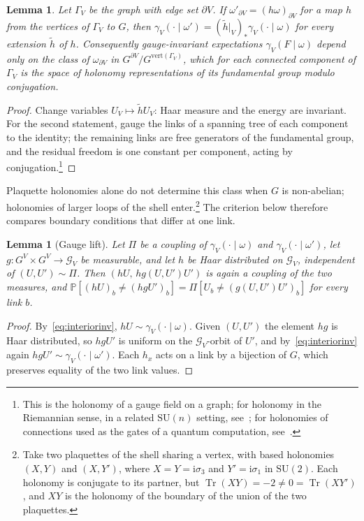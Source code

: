 \documentclass[aps,prd,twocolumn,superscriptaddress,nofootinbib,longbibliography,floatfix,amsmath,amssymb,10pt]{revtex4-2}
\newtheorem{lemma}[theorem]{Lemma}
\theoremstyle{definition}
\theoremstyle{remark}
\newcommand{\SU}{\mathrm{SU}}
\newcommand{\Tr}{\operatorname{Tr}}
\begin{document}
\begin{lemma}\label{lem:quotient}
Let $\Gamma_V$ be the graph with edge set $\partial V$. If
$\omega'_{\partial V}=(h\omega)_{\partial V}$ for a map $h$ from the vertices of
$\Gamma_V$ to $G$, then $\gamma_V(\cdot\mid\omega')=(\tilde h|_V)_*\gamma_V(
\cdot\mid\omega)$ for every extension $\tilde h$ of $h$. Consequently
gauge-invariant expectations $\gamma_V(F\mid\omega)$ depend only on the class of
$\omega_{\partial V}$ in $G^{\partial V}/G^{\mathrm{vert}(\Gamma_V)}$, which for
each connected component of $\Gamma_V$ is the space of holonomy
representations of its fundamental group modulo conjugation.
\end{lemma}

\begin{proof}
Change variables $U_V\mapsto\tilde hU_V$: Haar measure and the energy are
invariant. For the second statement, gauge the links of a spanning tree of
each component to the identity; the remaining links are free generators of
the fundamental group, and the residual freedom is one constant per
component, acting by conjugation.\footnote{This is the holonomy of a gauge
field on a graph; for holonomy in the Riemannian sense, in a related $\SU(n)$
setting, see~\cite{BTBS26}; for holonomies of connections used as the
gates of a quantum computation, see~\cite{Bha26Q}.}
\end{proof}

Plaquette holonomies alone do not determine this class when $G$ is
non-abelian; holonomies of larger loops of the shell enter.\footnote{Take two
plaquettes of the shell sharing a vertex, with based holonomies $(X,Y)$ and
$(X,Y')$, where $X=Y=\mathrm i\sigma_3$ and $Y'=\mathrm i\sigma_1$ in
$\SU(2)$. Each holonomy is conjugate to its partner, but $\Tr(XY)=-2\ne0=
\Tr(XY')$, and $XY$ is the holonomy of the boundary of the union of the two
plaquettes.} The criterion below therefore compares boundary conditions that
differ at one link.

\begin{lemma}[Gauge lift]\label{lem:lift}
Let $\Pi$ be a coupling of $\gamma_V(\cdot\mid\omega)$ and
$\gamma_V(\cdot\mid\omega')$, let $g\colon G^V\times G^V\to\mathcal G_V$ be
measurable, and let $h$ be Haar distributed on $\mathcal G_V$, independent of
$(U,U')\sim\Pi$. Then $(hU,\,hg(U,U')U')$ is again a coupling of the two
measures, and $\mathbb P[(hU)_b\ne(hgU')_b]=\Pi[U_b\ne(g(U,U')U')_b]$ for
every link $b$.
\end{lemma}

\begin{proof}
By~\eqref{eq:interiorinv}, $hU\sim\gamma_V(\cdot\mid\omega)$. Given $(U,U')$
the element $hg$ is Haar distributed, so $hgU'$ is uniform on the
$\mathcal G_V$-orbit of $U'$, and by~\eqref{eq:interiorinv} again
$hgU'\sim\gamma_V(\cdot\mid\omega')$. Each $h_x$ acts on a link by a bijection
of $G$, which preserves equality of the two link values.
\end{proof}
\end{document}
